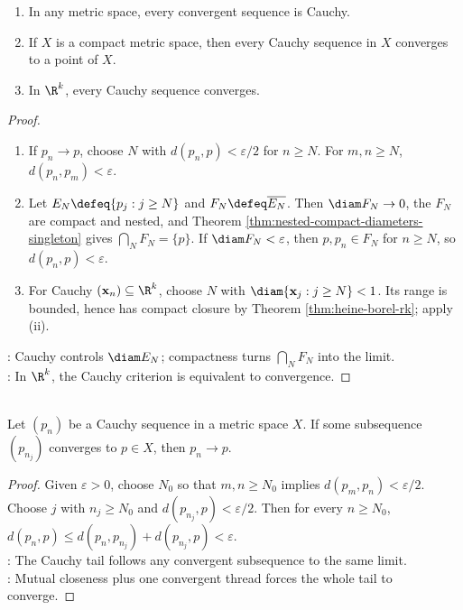 \begin{theorem} \label{thm:cauchy-convergence-criterion}\label{thm:sequences-completeness-main-source-todo} 
\begin{enumerate}[label=(\roman*)]
\setlength{\itemsep}{0pt}
\item In any metric space, every convergent sequence is Cauchy.
\item If $X$ is a compact metric space, then every Cauchy sequence in $X$ converges to a point of $X$.
\item In $\R^k$, every Cauchy sequence converges.
\end{enumerate}
\begin{proof}
\begin{enumerate}[label=(\roman*)]
\setlength{\itemsep}{0pt}
\item If $p_n\to p$, choose $N$ with $d(p_n,p)<\varepsilon/2$ for $n\geq N$. For $m,n\geq N$, $d(p_n,p_m)<\varepsilon$.
\item Let $E_N\defeq\{p_j:j\geq N\}$ and $F_N\defeq\overline{E_N}$. Then $\diam F_N\to0$, the $F_N$ are compact and nested, and Theorem \ref{thm:nested-compact-diameters-singleton} gives $\bigcap_NF_N=\{p\}$. If $\diam F_N<\varepsilon$, then $p,p_n\in F_N$ for $n\geq N$, so $d(p_n,p)<\varepsilon$.
\item For Cauchy $(\mathbf{x}_n)\subseteq\R^k$, choose $N$ with $\diam\{\mathbf{x}_j:j\geq N\}<1$. Its range is bounded, hence has compact closure by Theorem \ref{thm:heine-borel-rk}; apply (ii).
\end{enumerate}
: Cauchy controls $\diam E_N$; compactness turns $\bigcap_NF_N$ into the limit.\\
: In $\R^k$, the Cauchy criterion is equivalent to convergence.
\end{proof}
\end{theorem}

\begin{lemma} \label{lem:cauchy-sequence-with-convergent-subsequence} \\
Let $(p_n)$ be a Cauchy sequence in a metric space $X$. If some subsequence $(p_{n_j})$ converges to $p\in X$, then $p_n\to p$.
\begin{proof}
Given $\varepsilon>0$, choose $N_0$ so that $m,n\geq N_0$ implies $d(p_m,p_n)<\varepsilon/2$.\\
Choose $j$ with $n_j\geq N_0$ and $d(p_{n_j},p)<\varepsilon/2$. Then for every $n\geq N_0$, $d(p_n,p)\leq d(p_n,p_{n_j})+d(p_{n_j},p)<\varepsilon$.\\
: The Cauchy tail follows any convergent subsequence to the same limit.\\
: Mutual closeness plus one convergent thread forces the whole tail to converge.
\end{proof}
\end{lemma}

